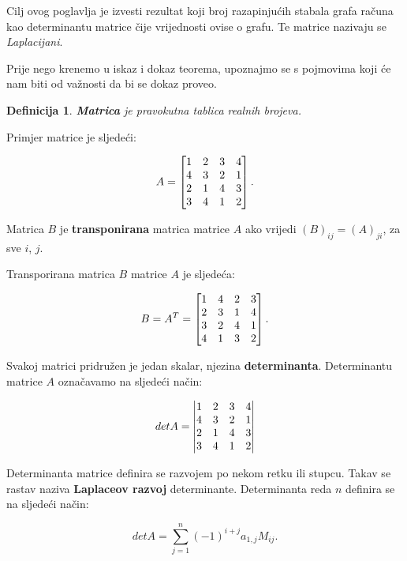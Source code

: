 \documentclass[times, utf8, zavrsni]{fer}
\newtheorem{definition}{Definicija}[section]
\begin{document}
Cilj ovog poglavlja je izvesti rezultat koji broj razapinjućih stabala grafa računa kao determinantu matrice čije vrijednosti ovise o grafu. Te matrice nazivaju se \textit{Laplacijani}.

Prije nego krenemo u iskaz i dokaz teorema, upoznajmo se s pojmovima koji će nam biti od važnosti da bi se dokaz proveo.

\begin{definition}
	\textbf{Matrica} je pravokutna tablica realnih brojeva.
\end{definition}

Primjer matrice je sljedeći:

\[
\centering
A = 
\begin{bmatrix}
	1 & 2 & 3 & 4 \\
	4 & 3 & 2 & 1 \\
	2 & 1 & 4 & 3 \\
	3 & 4 & 1 & 2
\end{bmatrix}.
\]

Matrica $B$ je \textbf{transponirana} matrica matrice $A$ ako vrijedi $(B)_{ij} = (A)_{ji}$, za sve $i$, $j$.

Transporirana matrica $B$ matrice $A$ je sljedeća:

\[
\centering
B = A^T =
\begin{bmatrix}
	1 & 4 & 2 & 3\\
	2 & 3 & 1 & 4\\
	3 & 2 & 4 & 1\\
	4 & 1 & 3 & 2 
\end{bmatrix}.
\]

Svakoj matrici pridružen je jedan skalar, njezina \textbf{determinanta}. Determinantu matrice $A$ označavamo na sljedeći način:

 \[
\centering
det A =
\left|
\begin{matrix}
	1 & 2 & 3 & 4 \\
	4 & 3 & 2 & 1 \\
	2 & 1 & 4 & 3 \\
	3 & 4 & 1 & 2
\end{matrix}
\right|
\]

Determinanta matrice definira se razvojem po nekom retku ili stupcu. Takav se rastav naziva \textbf{Laplaceov razvoj} determinante. Determinanta reda $n$ definira se na sljedeći način:

\begin{equation}
	detA = \sum_{j = 1}^{n} (-1)^{i+j} a_{1,j} M_{ij}.
\end{equation}
\end{document}
